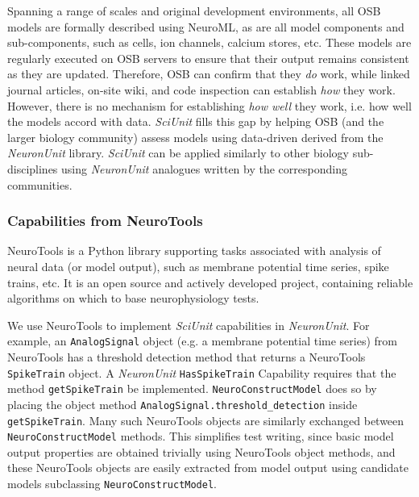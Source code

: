 \documentclass[11pt,letterpaper]{article}
\let\verbx\lstinline
\begin{document}
Spanning a range of scales and original development environments, all OSB models are formally described using NeuroML, as are all model components and sub-components, such as cells, ion channels, calcium stores, etc.  These models are regularly executed on OSB servers to ensure that their output remains consistent as they are updated.  Therefore, OSB can confirm that they \textit{do} work, while linked journal articles, on-site wiki, and code inspection can establish \textit{how} they work. However, there is no mechanism for establishing \textit{how well} they work, i.e. how well the models accord with data.  \textit{SciUnit} fills this gap by helping OSB (and the larger biology community) assess models using data-driven derived from the \textit{NeuronUnit} library.  \textit{SciUnit} can be applied similarly to other biology sub-disciplines using \textit{NeuronUnit} analogues written by the corresponding communities.    

\subsubsection{Capabilities from NeuroTools}
NeuroTools\cite{neuralensemble_url} is a Python library supporting tasks associated with analysis of neural data (or model output), such as membrane potential time series, spike trains, etc. It is an open source and actively developed project, containing reliable algorithms on which to base neurophysiology tests.

We use NeuroTools to implement \textit{SciUnit} capabilities in \textit{NeuronUnit}.  For example, an \verbx{AnalogSignal} object (e.g. a membrane potential time series) from NeuroTools has a threshold detection method that returns a NeuroTools \verbx{SpikeTrain} object.  A \textit{NeuronUnit} \verbx{HasSpikeTrain} Capability requires that the method \verbx{getSpikeTrain} be implemented.  \verbx{NeuroConstructModel} does so by placing the object method \verbx{AnalogSignal.threshold_detection} inside \verbx{getSpikeTrain}.  Many such NeuroTools objects are similarly exchanged between \verbx{NeuroConstructModel} methods.  This simplifies test writing, since basic model output properties are obtained trivially using NeuroTools object methods, and these NeuroTools objects are easily extracted from model output using candidate models subclassing \verbx{NeuroConstructModel}.  
\end{document}
